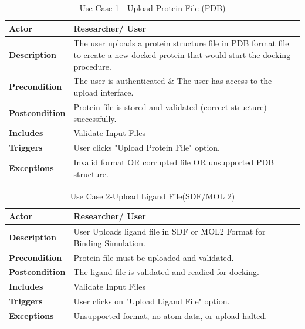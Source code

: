 \documentclass[12pt,a4]{report}
\begin{document}
\begin{itemize}
\begin{longtable}{|p{4cm}|p{9.8cm}|}
\caption{Use Case 1 - Upload Protein File (PDB)} \\ \hline
\textbf{Actor} & Researcher/ User \\ \hline
\textbf{Description} & The user uploads a protein structure file in PDB format file to create a new docked protein that would start the docking procedure. \\ \hline
\textbf{Precondition} & The user is authenticated \& The user has access to the upload interface. \\ \hline
\textbf{Postcondition} & Protein file is stored and validated (correct structure) successfully. \\ \hline
\textbf{Includes} & Validate Input Files \\ \hline
\textbf{Triggers} & User clicks "Upload Protein File" option. \\ \hline
\textbf{Exceptions} & Invalid format OR corrupted file OR unsupported PDB structure. \\ \hline
\end{longtable}

\begin{longtable}{|p{4cm}|p{9.8cm}|}
\caption{Use Case 2-Upload Ligand File(SDF/MOL 2)} \\ \hline
\textbf{Actor} & Researcher/ User \\ \hline
\textbf{Description} & User Uploads ligand file in SDF or MOL2 Format for Binding Simulation. \\ \hline
\textbf{Precondition} & Protein file must be uploaded and validated. \\ \hline
\textbf{Postcondition} & The ligand file is validated and readied for docking. \\ \hline
\textbf{Includes} & Validate Input Files \\ \hline
\textbf{Triggers} & User clicks on "Upload Ligand File" option. \\ \hline
\textbf{Exceptions} & Unsupported format, no atom data, or upload halted. \\ \hline
\end{longtable}


\end{itemize}
\end{document}
